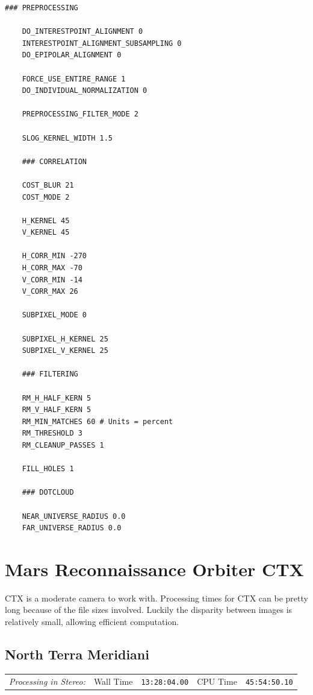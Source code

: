 \begin{center}\begin{minipage}{5.5in}
\begin{Verbatim}[frame=single,fontsize=\small,label=stereo.default for HiRISE North Terra Meridiani Crop]
    ### PREPROCESSING

    DO_INTERESTPOINT_ALIGNMENT 0
    INTERESTPOINT_ALIGNMENT_SUBSAMPLING 0
    DO_EPIPOLAR_ALIGNMENT 0

    FORCE_USE_ENTIRE_RANGE 1
    DO_INDIVIDUAL_NORMALIZATION 0

    PREPROCESSING_FILTER_MODE 2

    SLOG_KERNEL_WIDTH 1.5

    ### CORRELATION

    COST_BLUR 21
    COST_MODE 2

    H_KERNEL 45
    V_KERNEL 45

    H_CORR_MIN -270
    H_CORR_MAX -70
    V_CORR_MIN -14
    V_CORR_MAX 26

    SUBPIXEL_MODE 0

    SUBPIXEL_H_KERNEL 25
    SUBPIXEL_V_KERNEL 25

    ### FILTERING

    RM_H_HALF_KERN 5
    RM_V_HALF_KERN 5
    RM_MIN_MATCHES 60 # Units = percent
    RM_THRESHOLD 3
    RM_CLEANUP_PASSES 1

    FILL_HOLES 1

    ### DOTCLOUD

    NEAR_UNIVERSE_RADIUS 0.0
    FAR_UNIVERSE_RADIUS 0.0
\end{Verbatim}
\end{minipage}\end{center}

\vfill

\section{Mars Reconnaissance Orbiter CTX}

\ac{CTX} is a moderate camera to work with. Processing times
for \ac{CTX} can be pretty long because of the file sizes
involved. Luckily the disparity between images is relatively small,
allowing efficient computation.

\subsection{North Terra Meridiani}

\begin{tabular}{l r c r c}
\textit{Processing in Stereo:} & Wall Time & \texttt{13:28:04.00} & CPU Time & \texttt{45:54:50.10} \\
\end{tabular}

